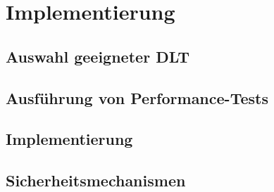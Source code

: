 \chapter{Implementierung}
\label{cha:implementierung}

\section{Auswahl geeigneter DLT}
\blindtext

\section{Ausführung von Performance-Tests}
\blindtext

\section{Implementierung}
\blindtext

\section{Sicherheitsmechanismen}
\blindtext

